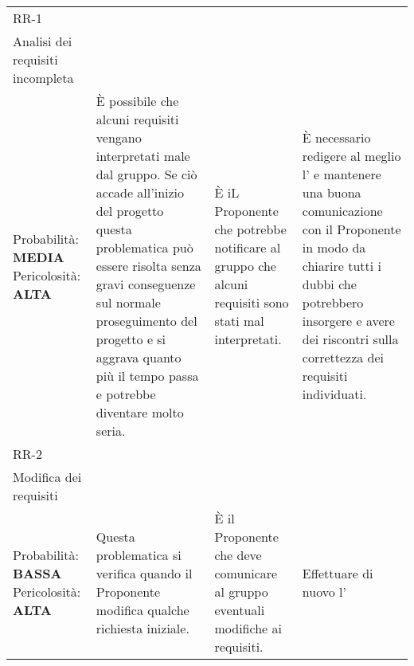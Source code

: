 \begin{longtable}{
		>{\centering}p{}
		>{\centering}p{}
		>{\centering}p{}
		>{\centering\arraybackslash}p{} }
	\rowcolor{lightRowColor}
	RR-1 \\ Analisi dei requisiti incompleta \\
		\vspace{5mm} %
		Probabilità: \textbf{MEDIA} Pericolosità: \textbf{ALTA} &
		È possibile che alcuni requisiti vengano interpretati male dal gruppo. Se ciò accade all'inizio del progetto questa problematica può essere risolta senza gravi conseguenze sul normale proseguimento del progetto e si aggrava quanto più il tempo passa e potrebbe diventare molto seria.
		&
		È iL Proponente che potrebbe notificare al gruppo che alcuni requisiti sono stati mal interpretati.
		&
		È necessario redigere al meglio l'\AdR{} e mantenere una buona comunicazione con il Proponente in modo da chiarire tutti i dubbi che potrebbero insorgere e avere dei riscontri sulla correttezza dei requisiti individuati. \\

	\rowcolor{darkRowColor}
		RR-2 \\ Modifica dei requisiti \\
		\vspace{5mm} %
		Probabilità: \textbf{BASSA} Pericolosità: \textbf{ALTA} &
		Questa problematica si verifica quando il Proponente modifica qualche richiesta iniziale.
		&
		È il Proponente che deve comunicare al gruppo eventuali modifiche ai requisiti.
		&
		Effettuare di nuovo l'\AdR{} \\


\end{longtable}
